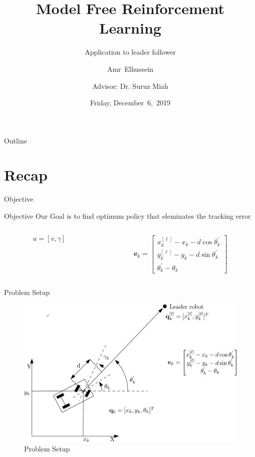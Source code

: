 \documentclass{beamer}
\title{Model Free Reinforcement Learning}
\subtitle{Application to leader follower}
\author[A.Elhussein]{Amr~Elhussein  \\\and
Advisor: Dr. Suruz Miah}
\institute[Bradley University] %
{
  Department of Electrical and Computer Engineering\\
  Bradley University\\
  1501 W. Bradley Avenue\\
  Peoria, IL, 61625, USA
}
\date[December~6,~2019]{Friday, December~6,~2019}
\begin{document}
\begin{frame}
  \titlepage
\end{frame}

\begin{frame}{Outline}
  \tableofcontents
\end{frame}


\section{Recap}
\begin{frame}{Objective}
\begin{block}{Objective}
Our Goal is to find optimum policy that eleminates the tracking error
\end{block}
\begin{columns}
\begin{column}{0.5\textwidth}
\begin{equation}
u = \left[v, \gamma\right]
\end{equation}
\end{column}
\begin{column}{0.5\textwidth}
\begin{equation}
\mathbf{e}_k = \begin{bmatrix}
     x_k^{[\ell]} - x_k - d\cos\theta_k^{'}
    \\ y_k^{[\ell]} - y_k - d\sin\theta_k^{'}
    \\ \theta_k^{'} - \theta_k
  \end{bmatrix}
\end{equation} 
\end{column}
\end{columns}
\end{frame}

\begin{frame}{Problem Setup}

\begin{figure}
\includegraphics[scale=0.23]{figs/ipe/LF-SetupUpdated.eps}
\caption{Problem Setup}
\end{figure}
\end{frame}
\end{document}
